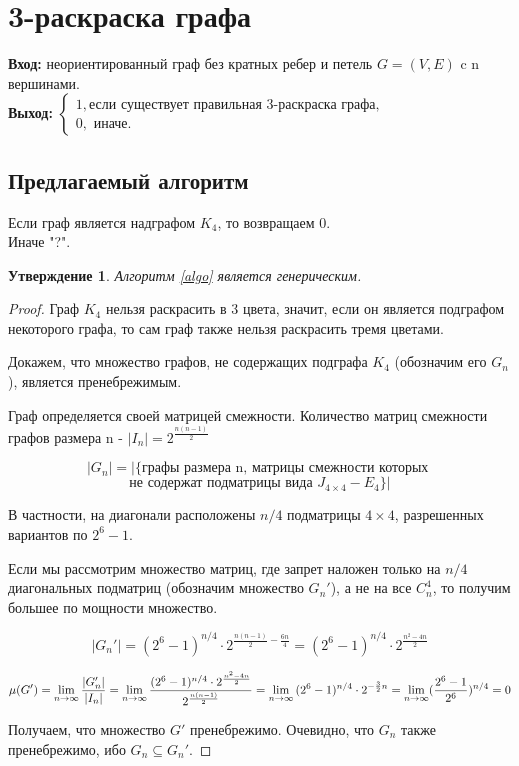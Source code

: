 \documentclass[a4paper, 12pt]{article}
\newtheorem*{theorem}{Утверждение}
\theoremstyle{definition}
\theoremstyle{remark}
\begin{document}
\section*{3-раскраска графа}
\textbf{Вход:} неориентированный граф без кратных ребер и петель $G = (V, E)$ c n вершинами.
\\
\textbf{Выход:} $\begin{cases}
    1,\text{если существует правильная 3-раскраска графа,}\\
    0,\text{ иначе.}
\end{cases}$
\subsection*{Предлагаемый алгоритм} \label{algo}
Если граф является надграфом $K_4$, то возвращаем 0. \\
Иначе "?".
\begin{theorem}
    Алгоритм \ref{algo} является генерическим.
\end{theorem}
\begin{proof}
    Граф $K_4$ нельзя раскрасить в 3 цвета, значит, если он является подграфом некоторого графа, то сам
    граф также нельзя раскрасить тремя цветами.
    
    Докажем, что множество графов, не содержащих подграфа $K_4$ (обозначим его $G_n$), является пренебрежимым.
    
    Граф определяется своей матрицей смежности. Количество матриц смежности графов размера n - $|I_n| = 2^{\frac{n(n-1)}{2}}$
    
    $$|G_n| = |\{\text{графы размера n, матрицы смежности которых }$$
    $$ \text{не содержат подматрицы вида }J_{4\times 4} - E_{4}\}|$$

    В частности, на диагонали расположены $n/4$ подматрицы $4\times 4$, разрешенных вариантов по $2^6 - 1$.

    Если мы рассмотрим множество матриц, где запрет наложен только на $n/4$ диагональных подматриц (обозначим множество $G_n'$), а не на все $C^4_n$, то получим большее по мощности множество.

    $$|G_n'| = (2^6-1)^{n/4} \cdot 2^{\frac{n(n-1)}{2} - \frac{6n}{4}} = (2^6-1)^{n/4} \cdot 2^{\frac{n^2 - 4n}{2}}$$

    $$\mu(G') = \lim_{n\to \infty} \frac{|G_n'|}{|I_n|} = \lim_{n\to \infty} \frac{(2^6-1)^{n/4} \cdot 2^{\frac{n^2 - 4n}{2}}}{2^{n(n-1)\over 2}} = \lim_{n\to\infty} {(2^6-1)^{n/4}}\cdot 2^{-\frac{3}{2}n} = \lim_{n\to \infty} (\frac{2^6 - 1}{2^6})^{n/4} = 0$$

    Получаем, что множество $G'$ пренебрежимо. Очевидно, что $G_n$ также пренебрежимо, ибо $G_n\subseteq G_n'$. 
\end{proof}
\end{document}
